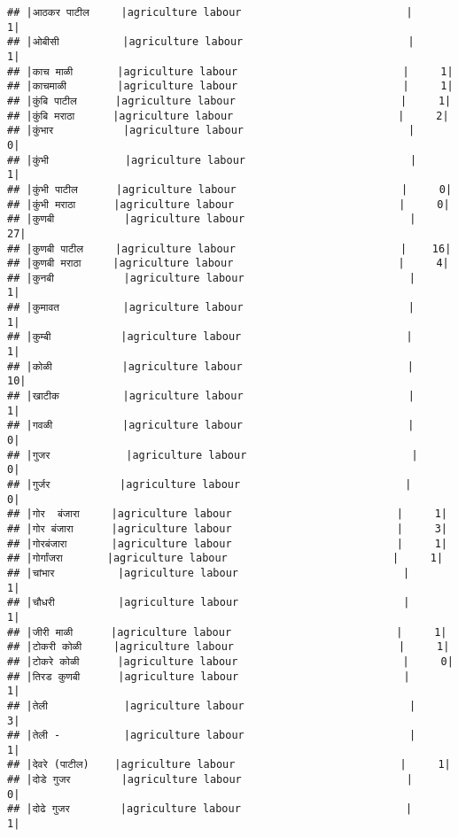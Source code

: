 \documentclass[
]{article}
\begin{document}
\begin{verbatim}
## |आठकर पाटील     |agriculture labour                          |     1|
## |ओबीसी          |agriculture labour                          |     1|
## |काच माळी       |agriculture labour                          |     1|
## |काचमाळी        |agriculture labour                          |     1|
## |कुंबि पाटील      |agriculture labour                          |     1|
## |कुंबि मराठा      |agriculture labour                          |     2|
## |कुंभार           |agriculture labour                          |     0|
## |कुंभी            |agriculture labour                          |     1|
## |कुंभी पाटील      |agriculture labour                          |     0|
## |कुंभी मराठा      |agriculture labour                          |     0|
## |कुणबी           |agriculture labour                          |    27|
## |कुणबी पाटील     |agriculture labour                          |    16|
## |कुणबी मराठा     |agriculture labour                          |     4|
## |कुनबी           |agriculture labour                          |     1|
## |कुमावत          |agriculture labour                          |     1|
## |कुम्बी           |agriculture labour                          |     1|
## |कोळी           |agriculture labour                          |    10|
## |खाटीक          |agriculture labour                          |     1|
## |गवळी           |agriculture labour                          |     0|
## |गुजर            |agriculture labour                          |     0|
## |गुर्जर           |agriculture labour                          |     0|
## |गोर  बंजारा     |agriculture labour                          |     1|
## |गोर बंजारा      |agriculture labour                          |     3|
## |गोरबंजारा       |agriculture labour                          |     1|
## |गोर्गांजरा       |agriculture labour                          |     1|
## |चांभार          |agriculture labour                          |     1|
## |चौधरी          |agriculture labour                          |     1|
## |जीरी माळी      |agriculture labour                          |     1|
## |टोकरी कोळी     |agriculture labour                          |     1|
## |टोकरे कोळी      |agriculture labour                          |     0|
## |तिरड कुणबी      |agriculture labour                          |     1|
## |तेली            |agriculture labour                          |     3|
## |तेली -          |agriculture labour                          |     1|
## |देवरे (पाटील)    |agriculture labour                          |     1|
## |दोडे गुजर        |agriculture labour                          |     0|
## |दोढे गुजर        |agriculture labour                          |     1|

\end{verbatim}
\end{document}
